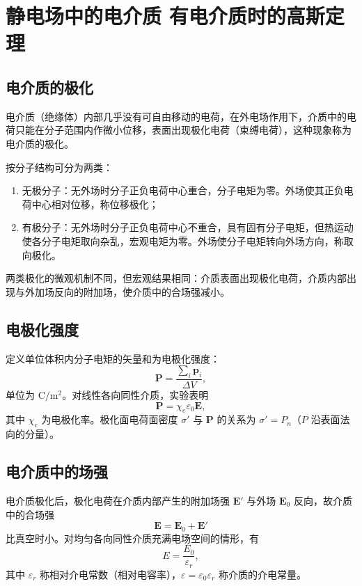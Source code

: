 
\section{静电场中的电介质 有电介质时的高斯定理}
    \subsection{电介质的极化}
    电介质（绝缘体）内部几乎没有可自由移动的电荷，在外电场作用下，介质中的电荷只能在分子范围内作微小位移，表面出现极化电荷（束缚电荷），这种现象称为电介质的极化。

    按分子结构可分为两类：
    \begin{enumerate}
        \item 无极分子：无外场时分子正负电荷中心重合，分子电矩为零。外场使其正负电荷中心相对位移，称位移极化；
        \item 有极分子：无外场时分子正负电荷中心不重合，具有固有分子电矩，但热运动使各分子电矩取向杂乱，宏观电矩为零。外场使分子电矩转向外场方向，称取向极化。
    \end{enumerate}
    两类极化的微观机制不同，但宏观结果相同：介质表面出现极化电荷，介质内部出现与外加场反向的附加场，使介质中的合场强减小。

    \subsection{电极化强度}
    定义单位体积内分子电矩的矢量和为电极化强度：
    \[
    \boldsymbol{P}=\frac{\sum_i\boldsymbol{p}_i}{\Delta V},
    \]
    单位为 $\mathrm{C/m^{2}}$。对线性各向同性介质，实验表明
    \[
    \boldsymbol{P}=\chi_e\varepsilon_0\boldsymbol{E},
    \]
    其中 $\chi_e$ 为电极化率。极化面电荷面密度 $\sigma'$ 与 $\boldsymbol{P}$ 的关系为 $\sigma'=P_n$（$P$ 沿表面法向的分量）。

    \subsection{电介质中的场强}
    电介质极化后，极化电荷在介质内部产生的附加场强 $\boldsymbol{E}'$ 与外场 $\boldsymbol{E}_0$ 反向，故介质中的合场强
    \[
    \boldsymbol{E}=\boldsymbol{E}_0+\boldsymbol{E}'
    \]
    比真空时小。对均匀各向同性介质充满电场空间的情形，有
    \[
    E=\frac{E_0}{\varepsilon_r},
    \]
    其中 $\varepsilon_r$ 称相对介电常数（相对电容率），$\varepsilon=\varepsilon_0\varepsilon_r$ 称介质的介电常量。

